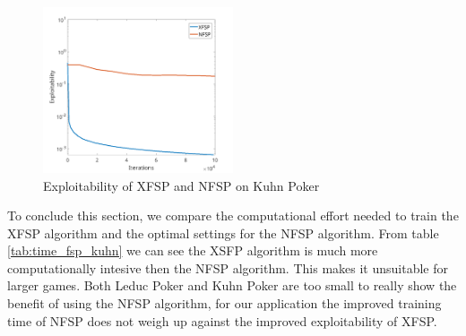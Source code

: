 \documentclass[10pt,a4paper]{article}
\begin{document}
\begin{figure}[h]
\centering
\label{fig:layers_kuhn}
\includegraphics[width=0.5\textwidth]{Figures/xfsp_nfsp_kuhn.png}
\caption{Exploitability of XFSP and NFSP on Kuhn Poker}
\end{figure}



To conclude this section, we compare the computational effort needed to train the XFSP algorithm and the optimal settings for the NFSP algorithm. From table \ref{tab:time_fsp_kuhn} we can see the XSFP algorithm is much more computationally intesive then the NFSP algorithm. This makes it unsuitable for larger games. Both Leduc Poker and Kuhn Poker are too small to really show the benefit of using the NFSP algorithm, for our application the improved training time of NFSP does not weigh up against the improved exploitability of XFSP.
\end{document}
